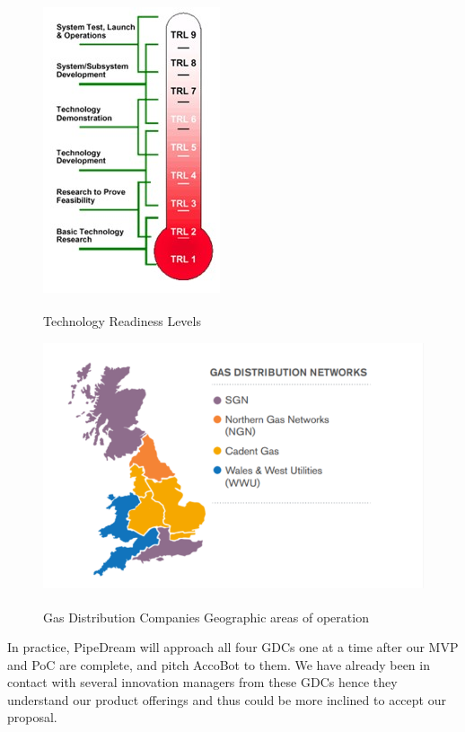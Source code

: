 \documentclass[11pt]{article}		%
\newlength{\imageheight}	 %
\newcommand{\supercite}[1]{\textsuperscript{\cite{#1}}}		%
\begin{document}
    	\begin{figure}[h]
    					\centering
    					\begin{multicols}{2}
    						\includegraphics[height=\imageheight]{TRL.jpg}
    						\caption{Technology Readiness Levels\supercite{trl}}
    						\label{techReadyLevels}
    						\columnbreak
    						\includegraphics[height=\imageheight]{distribution.pdf}
    						\caption{Gas Distribution Companies Geographic areas of operation\supercite{Gas_Distribution_Industry}}
    						\label{distrit2}
    					\end{multicols}
    				\end{figure}
    		\vspace{-0.5cm}
	    \hspace*{3ex}In practice, PipeDream will approach all four GDCs one at a time after our MVP and PoC are complete, and pitch AccoBot to them. We have already been in contact with several innovation managers from these GDCs hence they understand our product offerings and thus could be more inclined to accept our proposal. 
\end{document}
